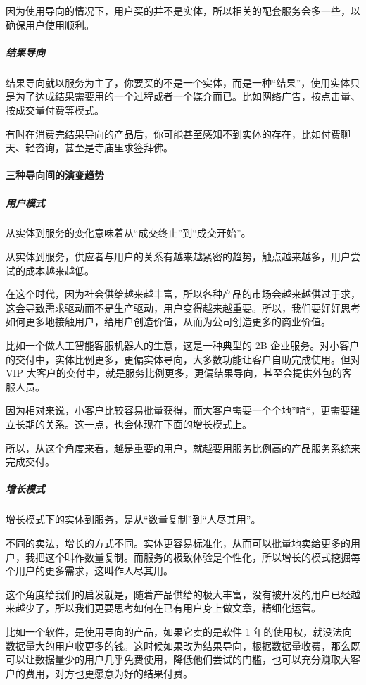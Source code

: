 \documentclass[letterpaper,11pt,english]{sphinxmanual}
\begin{document}
因为使用导向的情况下，用户买的并不是实体，所以相关的配套服务会多一些，以确保用户使用顺利。


\subparagraph{结果导向}
\label{\detokenize{chapter_introduction/Product:id28}}
结果导向就以服务为主了，你要买的不是一个实体，而是一种“结果”，使用实体只是为了达成结果需要用的一个过程或者一个媒介而已。比如网络广告，按点击量、按成交量付费等模式。

有时在消费完结果导向的产品后，你可能甚至感知不到实体的存在，比如付费聊天、轻咨询，甚至是寺庙里求签拜佛。


\paragraph{三种导向间的演变趋势}
\label{\detokenize{chapter_introduction/Product:id29}}

\subparagraph{用户模式}
\label{\detokenize{chapter_introduction/Product:id30}}
从实体到服务的变化意味着从“成交终止”到“成交开始”。

从实体到服务，供应者与用户的关系有越来越紧密的趋势，触点越来越多，用户尝试的成本越来越低。

在这个时代，因为社会供给越来越丰富，所以各种产品的市场会越来越供过于求，这会导致需求驱动而不是生产驱动，用户变得越来越重要。所以，我们要好好思考如何更多地接触用户，给用户创造价值，从而为公司创造更多的商业价值。

比如一个做人工智能客服机器人的生意，这是一种典型的 2B
企业服务。对小客户的交付中，实体比例更多，更偏实体导向，大多数功能让客户自助完成使用。但对
VIP
大客户的交付中，就是服务比例更多，更偏结果导向，甚至会提供外包的客服人员。

因为相对来说，小客户比较容易批量获得，而大客户需要一个个地”啃“，更需要建立长期的关系。这一点，也会体现在下面的增长模式上。

所以，从这个角度来看，越是重要的用户，就越要用服务比例高的产品服务系统来完成交付。


\subparagraph{增长模式}
\label{\detokenize{chapter_introduction/Product:id31}}
增长模式下的实体到服务，是从“数量复制”到“人尽其用”。

不同的卖法，增长的方式不同。实体更容易标准化，从而可以批量地卖给更多的用户，我把这个叫作数量复制。而服务的极致体验是个性化，所以增长的模式挖掘每个用户的更多需求，这叫作人尽其用。

这个角度给我们的启发就是，随着产品供给的极大丰富，没有被开发的用户已经越来越少了，所以我们更要思考如何在已有用户身上做文章，精细化运营。

比如一个软件，是使用导向的产品，如果它卖的是软件 1
年的使用权，就没法向数据量大的用户收更多的钱。这时候如果改为结果导向，根据数据量收费，那么既可以让数据量少的用户几乎免费使用，降低他们尝试的门槛，也可以充分赚取大客户的费用，对方也更愿意为好的结果付费。
\end{document}
